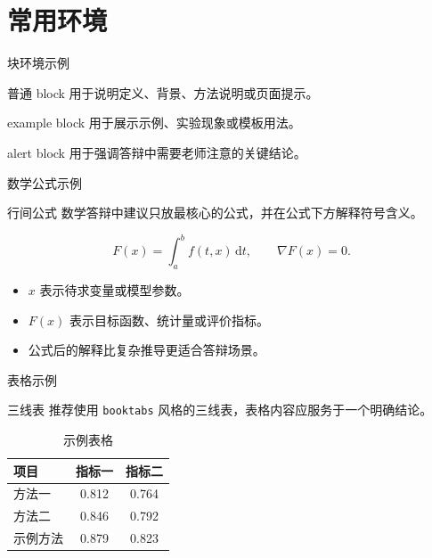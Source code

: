 \documentclass[12pt,aspectratio=43]{beamer}
\newcommand{\JLUSectionTitleThree}{常用环境}
\begin{document}
\section{\JLUSectionTitleThree}

\begin{frame}{块环境示例}
  \begin{block}{普通 block}
    用于说明定义、背景、方法说明或页面提示。
  \end{block}

  \begin{exampleblock}{example block}
    用于展示示例、实验现象或模板用法。
  \end{exampleblock}

  \begin{alertblock}{alert block}
    用于强调答辩中需要老师注意的关键结论。
  \end{alertblock}
\end{frame}

\begin{frame}{数学公式示例}
  \begin{block}{行间公式}
    数学答辩中建议只放最核心的公式，并在公式下方解释符号含义。
  \end{block}

  \begin{equation*}
    F(x)=\int_{a}^{b} f(t,x)\,\mathrm{d}t,
    \qquad
    \nabla F(x)=0.
  \end{equation*}

  \begin{itemize}
    \item $x$ 表示待求变量或模型参数。
    \item $F(x)$ 表示目标函数、统计量或评价指标。
    \item 公式后的解释比复杂推导更适合答辩场景。
  \end{itemize}
\end{frame}

\begin{frame}{表格示例}
  \begin{block}{三线表}
    推荐使用 \texttt{booktabs} 风格的三线表，表格内容应服务于一个明确结论。
  \end{block}

  \begin{table}
    \centering
    \caption{示例表格}
    \begin{tabular}{lcc}
      \toprule
      项目 & 指标一 & 指标二 \\
      \midrule
      方法一 & 0.812 & 0.764 \\
      方法二 & 0.846 & 0.792 \\
      示例方法 & \alert{0.879} & \alert{0.823} \\
      \bottomrule
    \end{tabular}
  \end{table}
\end{frame}
\end{document}
